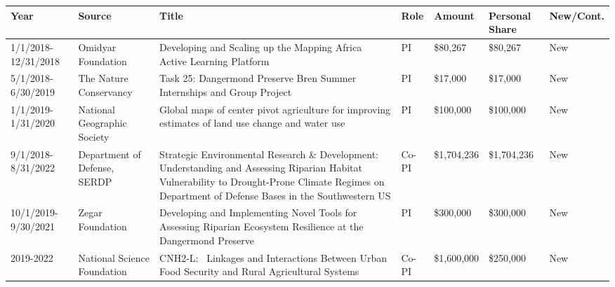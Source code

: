
\begin{longtable}{p{1.75cm}>{\raggedright}p{2.75cm}p{5.5cm}p{1cm}p{1.25cm}p{1.25cm}p{1cm}}
Year & Source & Title & Role & Amount & Personal Share & New/Cont.\\
\hline 
\endhead 
1/1/2018-12/31/2018 & Omidyar Foundation & Developing and Scaling up the Mapping Africa Active Learning Platform & PI  & \$80,267 & \$80,267 & New \\ 
5/1/2018-6/30/2019 & The Nature Conservancy & Task 25: Dangermond Preserve Bren Summer Internships and Group Project & PI  & \$17,000 & \$17,000 & New \\ 
1/1/2019-1/31/2020 & National Geographic Society & Global maps of center pivot agriculture for improving estimates of land use change and water use & PI  & \$100,000 & \$100,000 & New \\ 
9/1/2018-8/31/2022 & Department of Defense, SERDP & Strategic Environmental Research \& Development: Understanding and Assessing Riparian Habitat Vulnerability to Drought-Prone Climate Regimes on Department of Defense Bases in the Southwestern US 
 & Co-PI  & \$1,704,236 & \$1,704,236 & New \\ 
10/1/2019-9/30/2021 & Zegar Foundation & Developing and Implementing Novel Tools for Assessing Riparian Ecosystem Resilience at the Dangermond Preserve & PI  & \$300,000 & \$300,000 & New \\ 
2019-2022 & National Science Foundation & CNH2-L:  Linkages and Interactions Between Urban Food Security and Rural Agricultural Systems & Co-PI  & \$1,600,000 & \$250,000 & New \\ 
\end{longtable}


